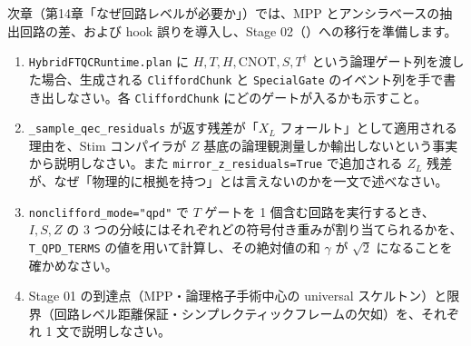 次章（第14章「なぜ回路レベルが必要か」）では、MPP とアンシラベースの抽出回路の差、および hook 誤りを導入し、Stage 02（）への移行を準備します。

\begin{exercise}
  \begin{enumerate}
    \item \texttt{HybridFTQCRuntime.plan} に $H, T, H, \mathrm{CNOT}, S, T^\dagger$ という論理ゲート列を渡した場合、生成される \texttt{CliffordChunk} と \texttt{SpecialGate} のイベント列を手で書き出しなさい。各 \texttt{CliffordChunk} にどのゲートが入るかも示すこと。
    \item \texttt{\_sample\_qec\_residuals} が返す残差が「$X_L$ フォールト」として適用される理由を、Stim コンパイラが $Z$ 基底の論理観測量しか輸出しないという事実から説明しなさい。また \texttt{mirror\_z\_residuals=True} で追加される $Z_L$ 残差が、なぜ「物理的に根拠を持つ」とは言えないのかを一文で述べなさい。
    \item \texttt{nonclifford\_mode="qpd"} で $T$ ゲートを 1 個含む回路を実行するとき、$I, S, Z$ の 3 つの分岐にはそれぞれどの符号付き重みが割り当てられるかを、\texttt{T\_QPD\_TERMS} の値を用いて計算し、その絶対値の和 $\gamma$ が $\sqrt{2}$ になることを確かめなさい。
    \item Stage 01 の到達点（MPP・論理格子手術中心の universal スケルトン）と限界（回路レベル距離保証・シンプレクティックフレームの欠如）を、それぞれ 1 文で説明しなさい。
  \end{enumerate}
\end{exercise}
